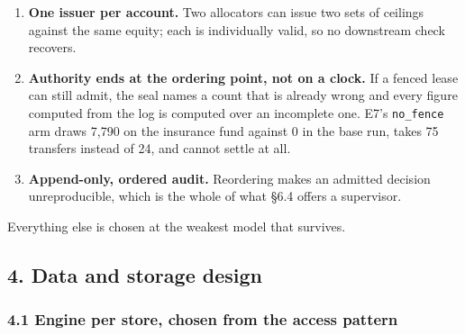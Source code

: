 \documentclass[10pt,a4paper]{article}
\providecommand{\tightlist}{\setlength{\itemsep}{0pt}\setlength{\parskip}{0pt}}
\begin{document}
\begin{enumerate}
\def\labelenumi{\arabic{enumi}.}
\tightlist
\item
  \textbf{One issuer per account.} Two allocators can issue two sets of ceilings
  against the same equity; each is individually valid, so no downstream check
  recovers.
\item
  \textbf{Authority ends at the ordering point, not on a clock.} If a fenced lease
  can still admit, the seal names a count that is already wrong and every figure
  computed from the log is computed over an incomplete one. E7's \texttt{no\_fence} arm
  draws 7,790 on the insurance fund against 0 in the base run, takes 75
  transfers instead of 24, and cannot settle at all.
\item
  \textbf{Append-only, ordered audit.} Reordering makes an admitted decision
  unreproducible, which is the whole of what §6.4 offers a supervisor.
\end{enumerate}

Everything else is chosen at the weakest model that survives.



\label{start:5}%

\subsection{4. Data and storage design}\label{data-and-storage-design}

\subsubsection{4.1 Engine per store, chosen from the access pattern}\label{engine-per-store-chosen-from-the-access-pattern}
\end{document}
